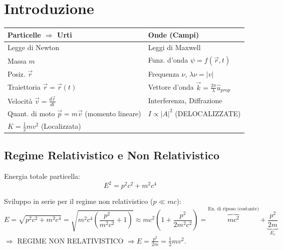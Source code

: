\documentclass[11pt, a4paper]{article}
\begin{document}
\tableofcontents

\newpage
\section{Introduzione}

\begin{table}[h!]
    \centering
    \begin{tabular}{ll}
        \toprule
        \textbf{Particelle $\Rightarrow$ Urti} & \textbf{Onde (Campi)} \\
        \midrule
        Legge di Newton & Leggi di Maxwell \\
        Massa $m$ & Funz. d'onda $\psi = f(\vec{r},t)$ \\
        Posiz. $\vec{r}$ & Frequenza $\nu$, \quad $\lambda \nu = |v|$ \\
        Traiettoria $\vec{r} = \vec{r}(t)$ & Vettore d'onda $\vec{k} = \frac{2\pi}{\lambda}\hat{u}_{prop}$ \\
        Velocità $\vec{v} = \frac{d\vec{r}}{dt}$ & Interferenza, Diffrazione \\
        Quant. di moto $\vec{p} = m\vec{v}$ (momento lineare) & $I \propto |A|^2$ (DELOCALIZZATE) \\
        $K = \frac{1}{2}mv^2$ (Localizzata) & \\
        \bottomrule
    \end{tabular}
\end{table}

\subsection{Regime Relativistico e Non Relativistico}
Energia totale particella:
\begin{equation}
    E^2 = p^2c^2 + m^2c^4
\end{equation}

Sviluppo in serie per il regime non relativistico ($p \ll mc$):
\begin{equation}
    E = \sqrt{p^2c^2 + m^2c^4} = \sqrt{m^2c^4 \left(\frac{p^2}{m^2c^2} + 1\right)} \approx mc^2 \left(1 + \frac{p^2}{2m^2c^2}\right) = \overbrace{mc^2}^{\text{En. di riposo (costante)}} + \underbrace{\frac{p^2}{2m}}_{E_c}
\end{equation}
$\Rightarrow$ REGIME NON RELATIVISTICO $\Rightarrow E = \frac{p^2}{2m} = \frac{1}{2}mv^2$.
\end{document}
